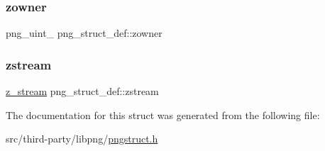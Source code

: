 \mbox{\label{structpng__struct__def_a5bfc727f45873680edacf4d12bebc8f4}} 
\subsubsection{\texorpdfstring{zowner}{zowner}}
{\footnotesize\ttfamily png\+\_\+uint\+\_ png\+\_\+struct\+\_\+def\+::zowner}

\mbox{\label{structpng__struct__def_aed56a6997ce7d1a90f0a143eb0964cd5}} 
\subsubsection{\texorpdfstring{zstream}{zstream}}
{\footnotesize\ttfamily \mbox{\hyperlink{zlib_8h_afa60092f4e0b9bc4f23b41c6930463f0}{z\+\_\+stream}} png\+\_\+struct\+\_\+def\+::zstream}



The documentation for this struct was generated from the following file\+:\begin{DoxyCompactItemize}
\item 
src/third-\/party/libpng/\mbox{\hyperlink{pngstruct_8h}{pngstruct.\+h}}\end{DoxyCompactItemize}
